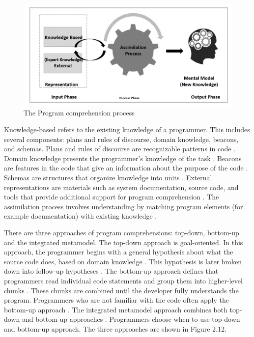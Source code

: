\begin{figure} [H]
  \centering
  \includegraphics[width=\textwidth]{figures/program_Comprehension_Process.png}
  \caption{The Program comprehension process}
  \label{fig:AnhangsChor}
\end{figure}




Knowledge-based refers to the existing knowledge of a programmer. This includes several components: plans and rules of discourse, domain knowledge, beacons, and schemas. Plans and rules of discourse are recognizable patterns in code \cite{fekete2020comprehensive}. Domain knowledge presents the programmer’s knowledge of the task \cite{kadar2021program}.
Beacons are features in the code that give an information about the purpose of the code \cite{fekete2020comprehensive}. Schemas are structures that organize knowledge into units \cite{kadar2021program}. External representations are materials such as system documentation, source code, and tools that provide additional support for program comprehension \cite{kadar2021program}. The assimilation process involves understanding by matching program elements (for example documentation) with existing knowledge \cite{von1995program}. 



There are three approaches of program comprehensions:  top-down, bottom-up and the integrated metamodel. The top-down approach is goal-oriented. In this approach, the programmer begins with a general hypothesis about what the source code does, based on domain knowledge \cite{storey2005theories}. This hypothesis is later broken down into follow-up hypotheses  \cite{fekete2020comprehensive}. The bottom-up approach defines that programmers read individual code statements and group them into higher-level chunks \cite{storey2005theories}. These chunks are combined until the developer fully understands the program.  Programmers who are not familiar with the code often apply the bottom-up approach \cite{kadar2021program}. The integrated metamodel approach combines both top-down and bottom-up approaches \cite{kadar2021program}.  Programmers choose when to use top-down and bottom-up approach.  The three approaches are shown in Figure 2.12.  



